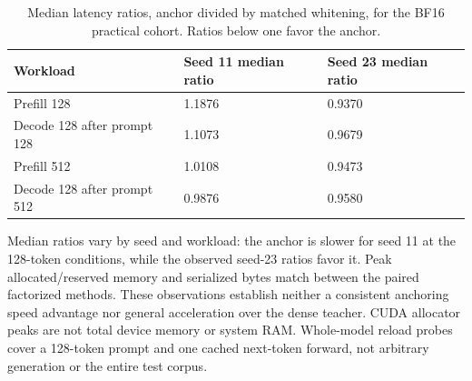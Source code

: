 \documentclass[conference]{IEEEtran}
\begin{document}
\begin{table}[t]
\centering
\caption{Median latency ratios, anchor divided by matched whitening, for the
BF16 practical cohort. Ratios below one favor the anchor.}
\label{tab:latency-ratios}
{\scriptsize\setlength{\tabcolsep}{2pt}
\noindent\begin{tabular}{@{}p{}p{}p{}@{}}\toprule
Workload & Seed 11 median ratio & Seed 23 median ratio \\
\midrule
Prefill 128 & 1.1876 & 0.9370 \\
Decode 128 after prompt 128 & 1.1073 & 0.9679 \\
Prefill 512 & 1.0108 & 0.9473 \\
Decode 128 after prompt 512 & 0.9876 & 0.9580 \\
\bottomrule\end{tabular}}\par\medskip
\end{table}
Median ratios vary by seed and workload: the anchor is slower for seed 11 at the 128-token conditions, while the observed seed-23 ratios favor it. Peak allocated/reserved memory and serialized bytes match between the paired factorized methods. These observations establish neither a consistent anchoring speed advantage nor general acceleration over the dense teacher. CUDA allocator peaks are not total device memory or system RAM. Whole-model reload probes cover a 128-token prompt and one cached next-token forward, not arbitrary generation or the entire test corpus.\par\smallskip
\end{document}
